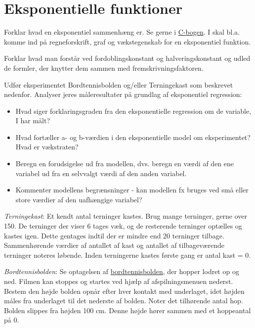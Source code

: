 \documentclass[10pt,a4paper,table]{article}
\begin{document}
\section{Eksponentielle funktioner}
\vspace{-0.7em}
Forklar hvad en eksponentiel sammenhæng er. Se gerne i \href{https://plusstxa1.systime.dk/?id=1227}{C-bogen}. I skal bl.a. komme ind på regneforskrift, graf og vækstegenskab for en eksponentiel funktion.

Forklar hvad man forstår ved fordoblingskonstant og halveringskonstant og udled de formler, der knytter dem sammen med fremskrivningsfaktoren.

Udfør eksperimentet Bordtennisbolden og/eller Terningekast som beskrevet nedenfor. Analyser jeres måleresultater på grundlag af eksponentiel regression:

\begin{itemize}
  \item Hvad siger forklaringsgraden fra den eksponentielle regression om de variable, I har målt?
  \item Hvad fortæller a- og b-værdien i den eksponentielle model om eksperimentet? Hvad er vækstraten?
  \item Beregn en forudsigelse ud fra modellen, dvs. beregn en værdi af den ene variabel ud fra en selvvalgt værdi af den anden variabel.
  \item Kommenter modellens begrænsninger - kan modellen fx bruges ved små eller store værdier af den uafhængige variabel?
\end{itemize}

\emph{Terningekast}:
Et kendt antal terninger kastes. Brug mange terninger, gerne over 150. De terninger der viser 6 tages væk, og de resterende terninger optælles og kastes igen. Dette gentages indtil der er mindre end 20 terninger tilbage. Sammenhørende værdier af antallet af kast og antallet af tilbageværende terninger noteres løbende. Inden terningerne kastes første gang er antal kast = 0.

\emph{Bordtennisbolden}:
Se optagelsen af \href{https://plusstxa1.systime.dk/?id=1098#c8122}{bordtennisbolden}, der hopper lodret op og ned. Filmen kan stoppes og startes ved hjælp af afspilningsmenuen nederst. Bestem den højde bolden opnår efter hver kontakt med underlaget, idet højden måles fra underlaget til det nederste af bolden. Noter det tilhørende antal hop. Bolden slippes fra højden 100 cm. Denne højde hører sammen med et hoppeantal på 0.
\end{document}
